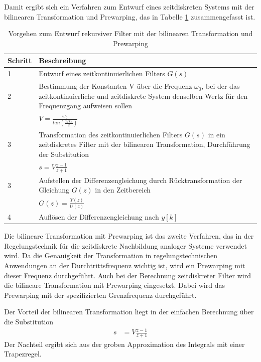 Damit ergibt sich ein Verfahren zum Entwurf eines zeitdiskreten Systems mit der bilinearen Transformation und Prewarping, das in Tabelle \ref{tab:9.5} zusammengefasst ist.

\begin{table}
  \centering
  \caption{Vorgehen zum Entwurf rekursiver Filter mit der bilinearen Transformation und Prewarping}
  \label{tab:9.5}
  \begin{tabular}{ll}
    \toprule
    Schritt & Beschreibung \\
    \midrule
    1 & Entwurf eines zeitkontinuierlichen Filters \(G(s)\) \\
    2 & Bestimmung der Konstanten V über die Frequenz \(ω_{0}\), bei der das zeitkontinuierliche und zeitdiskrete System denselben Wertz für den Frequenzgang aufweisen sollen \\
    & \(V = \frac{\omega_{0}}{tan\left( \frac{\omega_{0}  T_{A}}{2} \right)}\) \\
    3 & Transformation des zeitkontinuierlichen Filters \(G(s)\) in ein zeitdiskretes Filter mit der bilinearen Transformation, Durchführung der Substitution \\
    & \(s = V  \frac{z - 1}{z + 1}\) \\
    3 & Aufstellen der Differenzengleichung durch Rücktransformation der Gleichung \(G(z)\) in den Zeitbereich \\
    & \(G(z) = \frac{Y(z)}{U(z)}\) \\
    4 & Auflösen der Differenzengleichung nach \(y[k]\) \\
    \bottomrule
  \end{tabular}
\end{table}

Die bilineare Transformation mit Prewarping ist das zweite Verfahren, das in der Regelungstechnik für die zeitdiskrete Nachbildung analoger Systeme verwendet wird. Da die Genauigkeit der Transformation in regelungstechnischen Anwendungen an der Durchtrittsfrequenz wichtig ist, wird ein Prewarping mit dieser Frequenz durchgeführt. Auch bei der Berechnung zeitdiskreter Filter wird die bilineare Transformation mit Prewarping eingesetzt. Dabei wird das Prewarping mit der spezifizierten Grenzfrequenz durchgeführt.

Der Vorteil der bilinearen Transformation liegt in der einfachen Berechnung über die Substitution
\begin{align}
s &= V  \frac{z - 1}{z + 1} \label{eq:9.92}
\end{align}
Der Nachteil ergibt sich aus der groben Approximation des Integrals mit einer Trapezregel.

